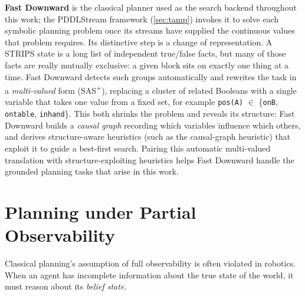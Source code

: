 \textbf{Fast Downward} \cite{helmert2006fast} is the classical planner used as the search backend throughout this work; the PDDLStream framework (\cref{sec:tamp}) invokes it to solve each symbolic planning problem once its streams have supplied the continuous values that problem requires. Its distinctive step is a change of representation. A STRIPS state is a long list of independent true/false facts, but many of those facts are really mutually exclusive: a given block sits on exactly one thing at a time. Fast Downward detects such groups automatically and rewrites the task in a \emph{multi-valued} form (SAS\textsuperscript{+}), replacing a cluster of related Booleans with a single variable that takes one value from a fixed set, for example \texttt{pos(A)} $\in$ \{\texttt{onB}, \texttt{ontable}, \texttt{inhand}\}. This both shrinks the problem and reveals its structure: Fast Downward builds a \emph{causal graph} recording which variables influence which others, and derives structure-aware heuristics (such as the causal-graph heuristic) that exploit it to guide a best-first search. Pairing this automatic multi-valued translation with structure-exploiting heuristics helps Fast Downward handle the grounded planning tasks that arise in this work.

\section{Planning under Partial Observability}\label{sec:pod}
Classical planning's assumption of full observability is often violated in robotics. When an agent has incomplete information about the true state of the world, it must reason about its \textit{belief state}.

